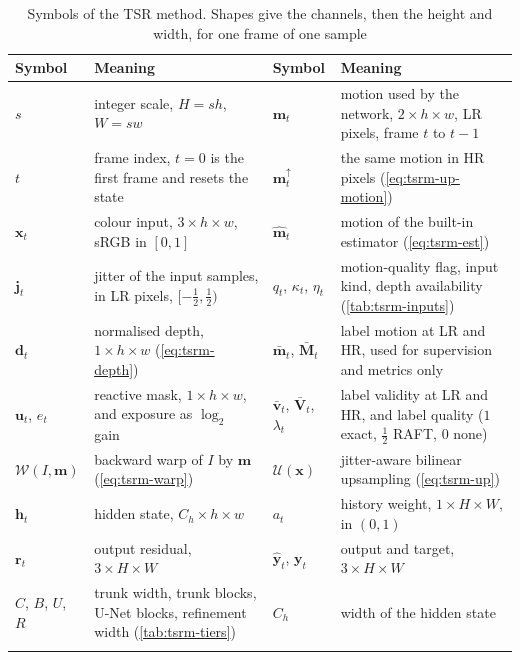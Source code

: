 \begin{table}[!htbp]
\caption{Symbols of the TSR method. Shapes give the channels, then the height and width, for one frame of one sample}\label{tab:tsrm-symbols}
\footnotesize
\begin{tabular*}{\textwidth}{@{\extracolsep\fill}p{}p{}p{}p{}}
\toprule
Symbol & Meaning & Symbol & Meaning \\
\midrule
$s$ & integer scale, $H=sh$, $W=sw$ & $\mathbf{m}_t$ & motion used by the network, $2\times h\times w$, LR pixels, frame $t$ to $t-1$ \\
$t$ & frame index, $t=0$ is the first frame and resets the state & $\mathbf{m}_t^{\uparrow}$ & the same motion in HR pixels (\cref{eq:tsrm-up-motion}) \\
$\mathbf{x}_t$ & colour input, $3\times h\times w$, sRGB in $[0,1]$ & $\hat{\mathbf{m}}_t$ & motion of the built-in estimator (\cref{eq:tsrm-est}) \\
$\mathbf{j}_t$ & jitter of the input samples, in LR pixels, $[-\tfrac12,\tfrac12)$ & $q_t$, $\kappa_t$, $\eta_t$ & motion-quality flag, input kind, depth availability (\cref{tab:tsrm-inputs}) \\
$\mathbf{d}_t$ & normalised depth, $1\times h\times w$ (\cref{eq:tsrm-depth}) & $\bar{\mathbf{m}}_t$, $\bar{\mathbf{M}}_t$ & label motion at LR and HR, used for supervision and metrics only \\
$\mathbf{u}_t$, $e_t$ & reactive mask, $1\times h\times w$, and exposure as $\log_2$ gain & $\bar{\mathbf{v}}_t$, $\bar{\mathbf{V}}_t$, $\lambda_t$ & label validity at LR and HR, and label quality ($1$ exact, $\tfrac12$ RAFT, $0$ none) \\
$\mathcal{W}(I,\mathbf{m})$ & backward warp of $I$ by $\mathbf{m}$ (\cref{eq:tsrm-warp}) & $\mathcal{U}(\mathbf{x})$ & jitter-aware bilinear upsampling (\cref{eq:tsrm-up}) \\
$\mathbf{h}_t$ & hidden state, $C_h\times h\times w$ & $a_t$ & history weight, $1\times H\times W$, in $(0,1)$ \\
$\mathbf{r}_t$ & output residual, $3\times H\times W$ & $\hat{\mathbf{y}}_t$, $\mathbf{y}_t$ & output and target, $3\times H\times W$ \\
$C$, $B$, $U$, $R$ & trunk width, trunk blocks, U-Net blocks, refinement width (\cref{tab:tsrm-tiers}) & $C_h$ & width of the hidden state \\
\botrule
\end{tabular*}
\end{table}

